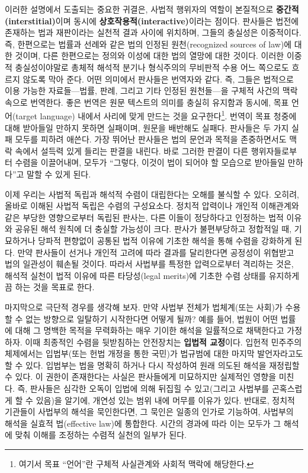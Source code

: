 \documentclass[12pt,a4paper]{article}
\begin{document}
이러한 설명에서 도출되는 중요한 귀결은, 사법적 행위자의 역할이
본질적으로 \textbf{중간적(interstitial)}이며 동시에
\textbf{상호작용적(interactive)}이라는 점이다. 판사들은 법전에 존재하는
법과 재판이라는 실천적 결과 사이에 위치하며, 그들의 충실성은 이중적이다.
즉, 한편으로는 법률과 선례와 같은 법의 인정된 원천(recognized sources of
law)에 대한 것이며, 다른 한편으로는 정의와 이성에 대한 법의 열망에 대한
것이다. 이러한 이중적 충실성이야말로 총체적 해석적 분기나 형식주의의
무비판적 수용 어느 쪽으로도 흐르지 않도록 막아 준다. 어떤 의미에서
판사들은 번역자와 같다. 즉, 그들은 법적으로 이용 가능한 자료들---법률,
판례, 그리고 기타 인정된 원천들---을 구체적 사건의 맥락 속으로 번역한다.
좋은 번역은 원문 텍스트의 의미를 충실히 유지함과 동시에, 목표
언어(target language) 내에서 사리에 맞게 만드는 것을
요구한다\footnote{여기서 목표 ``언어''란 구체적 사실관계와 사회적 맥락에
  해당한다.}. 번역이 목표 청중에 대해 받아들일 만하지 못하면 실패이며,
원문을 배반해도 실패다. 판사들은 두 가지 실패 모두를 피하려 애쓴다. 가장
뛰어난 판사들은 법의 문언과 목적을 존중하면서도 맥락 속에서 설득력 있게
들리는 판결을 내린다. 바로 그러한 판결이 다른 행위자들로부터 수렴을
이끌어내며, 모두가 ``그렇다, 이것이 법이 되어야 할 모습으로
\textsf{받아들일 만하다}''고 말할 수 있게 된다.

이제 우리는 사법적 독립과 해석적 수렴이 대립한다는 \textsf{오해}를 불식할
수 있다. 오히려, 올바로 이해된 사법적 독립은 수렴의 구성요소다. 정치적
압력이나 개인적 이해관계와 같은 부당한 영향으로부터 독립된 판사는, 다른
이들이 정당하다고 인정하는 \textsf{법적} 이유와 공유된 해석 원칙에 더
충실할 가능성이 크다. 판사가 불편부당하고 정합적일 때, 기묘하거나 당파적
편향없이 공통된 법적 이유에 기초한 해석을 통해 수렴을 강화하게 된다.
만약 판사들이 선거나 개인적 고려에 따라 결과를 달리한다면 공정성이
위협받고 법의 일관성이 훼손될 것이다. 따라서 사법부를 특정한
압력으로부터 격리하는 것은, 해석적 실천이 법적 이유에 따른 타당성(legal
merits)에 기초한 수렴 상태를 유지하게끔 하는 것을 목표로
한다\autocite{ross2013reconsidering}.

마지막으로 극단적 경우를 생각해 보자. 만약 사법부 전체가 법체계(또는
사회)가 수용할 수 없는 방향으로 일탈하기 시작한다면 어떻게 될까? 예를
들어, 법원이 어떤 법률에 대해 그 명백한 목적을 무력화하는 매우 기이한
해석을 일률적으로 채택한다고 가정하자. 이때 최종적인 수렴을 뒷받침하는
안전장치는 \textbf{입법적 교정}이다. 입헌적 민주주의 체제에서는
입법부(또는 헌법 개정을 통한 국민)가 법규범에 대한 마지막 발언자라고도
할 수 있다. 입법부는 법을 명확히 하거나 다시 작성하여 원래 의도된 해석을
재정립할 수 있다. 이 권한이 존재한다는 사실은 판사들에게 미묘하지만
실제적인 영향을 미친다. 즉, 판사들은 심각한 오독이 입법에 의해 뒤집힐 수
있고(그리고 사법부를 곤혹스럽게 할 수 있음)을 알기에, 개연성 있는 범위
내에 머무를 이유가 있다. 반대로, 정치적 기관들이 사법부의 해석을
묵인한다면, 그 묵인은 일종의 인가로 기능하여, 사법부의 해석을 실효적
법(effective law)에 통합한다. 시간의 경과에 따라 이는 모두가 그 해석에
맞춰 이해를 조정하는 수렴적 실천의 일부가 된다.
\end{document}
